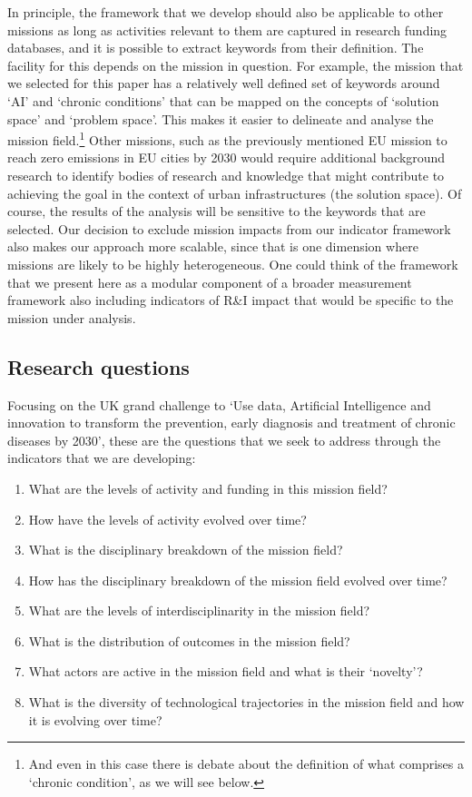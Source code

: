 \documentclass[11pt]{article}
\begin{document}
In principle, the framework that we develop should also be applicable to other missions as long as activities relevant to them are captured in research funding databases, and it is possible to extract keywords from their definition. The facility for this depends on the mission in question. For example, the mission that we selected for this paper has a relatively well defined set of keywords around `AI’ and `chronic conditions’ that can be mapped on the concepts of ‘solution space’ and ‘problem space’. This makes it easier to delineate and analyse the mission field.\footnote{And even in this case there is debate about the definition of what comprises a `chronic condition’, as
we will see below.} Other missions, such as the previously mentioned EU mission to reach zero emissions in EU cities by 2030 would require additional background research to identify bodies of research and knowledge that might contribute to achieving the goal in the context of urban infrastructures (the solution space). Of course, the results of the analysis will be sensitive to the keywords that are selected. Our decision to exclude mission impacts from our indicator framework also makes our approach more scalable, since that is one dimension where missions are likely to be highly heterogeneous. One could think of the framework that we present here as a modular component of a broader measurement framework also including indicators of R&I impact that would be specific to the mission under analysis.

\subsection{Research questions}
\label{subsec: questions}

Focusing on the UK grand challenge to `Use data, Artificial Intelligence and innovation to transform the prevention, early diagnosis and treatment of chronic diseases by 2030', these are the questions that we seek to address through the indicators that we are developing:

\begin{enumerate}
    \item What are the levels of activity and funding in this mission field?
    \item How have the levels of activity evolved over time?
    \item What is the disciplinary breakdown of the mission field?
    \item How has the disciplinary breakdown of the mission field evolved over time?
    \item What are the levels of interdisciplinarity in the mission field?
    \item What is the distribution of outcomes in the mission field?
    \item What actors are active in the mission field and what is their `novelty’?
    \item What is the diversity of technological trajectories in the mission field and how it is evolving over time?
\end{enumerate}
\end{document}
